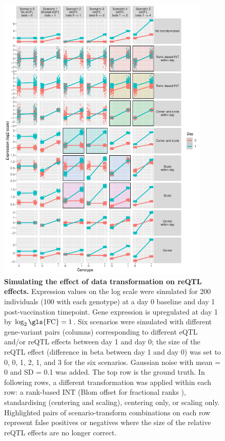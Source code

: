 \begin{figure}
    \centering
    \includegraphics[width=0.9\textwidth,page=1]{mainmatter/figures/chapter_03/simulate_expression_transforms.pdf}
    \caption{
        \textbf{Simulating the effect of data transformation on \gls{reQTL} effects.}
        Expression values on the log scale were simulated for 200 individuals (100 with each genotype) at a day 0 baseline and day 1 post-vaccination timepoint.
        Gene expression is upregulated at day 1 by $\log_2 \text{\gls{FC}} = 1$.
        Six scenarios were simulated with different gene-variant pairs (columns) corresponding to different \gls{eQTL} and/or \gls{reQTL} effects between day 1 and day 0;
        the size of the \gls{reQTL} effect (difference in beta between day 1 and day 0) was set to 0, 0, 1, 2, 1, and 3 for the six scenarios.
        Gaussian noise with mean = 0 and SD = 0.1 was added.
        The top row is the ground truth.
        In following rows, a different transformation was applied within each row: a rank-based \gls{INT} (Blom offset for fractional ranks \autocite{beasley2009RankBasedInverseNormal,mccaw2020OperatingCharacteristicsRank}), standardising (centering and scaling), centering only, or scaling only.
        Highlighted pairs of scenario-transform combinations on each row represent false positives or negatives where the size of the relative \gls{reQTL} effects are no longer correct.
    }
    \label{fig:hird_reQTL_expressionTransform_sims}
\end{figure}

